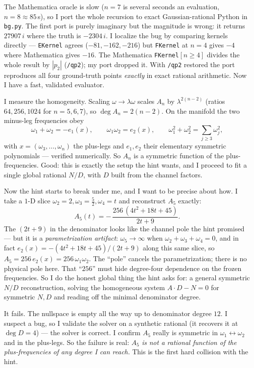 \documentclass{article}
\begin{document}
The Mathematica oracle is slow ($n=7$ is several seconds an evaluation,
$n=8\approx85$\,s), so I port the whole recursion to exact Gaussian-rational
Python in \texttt{bg.py}. The first port is purely imaginary but the magnitude is
wrong: it returns $27907\,i$ where the truth is $-2304\,i$. I localize the bug by
comparing kernels directly --- \texttt{EKernel} agrees ($-81,-162,-216$) but
\texttt{FKernel} at $n{=}4$ gives $-4$ where Mathematica gives $-16$. The
Mathematica \texttt{FKernel}$[n\ge4]$ divides the whole result by $|p_2|$
(\texttt{/qp2}); my port dropped it. With \texttt{/qp2} restored the port
reproduces all four ground-truth points \emph{exactly} in exact rational
arithmetic. Now I have a fast, validated evaluator.

I measure the homogeneity. Scaling $\omega\to\lambda\omega$ scales $A_n$ by
$\lambda^{2(n-2)}$ (ratios $64,256,1024$ for $n=5,6,7$), so $\deg A_n=2(n-2)$. On
the manifold the two minus-leg frequencies obey
\[
\omega_1+\omega_2=-e_1(x),\qquad \omega_1\omega_2=e_2(x),\qquad
\omega_1^2+\omega_2^2=\sum_{j\ge3}\omega_j^2,
\]
with $x=(\omega_3,\dots,\omega_n)$ the plus-legs and $e_1,e_2$ their elementary
symmetric polynomials --- verified numerically. So $A_n$ is a symmetric function
of the plus-frequencies. Good: this is exactly the setup the hint wants, and I
proceed to fit a single global rational $N/D$, with $D$ built from the channel
factors.

Now the hint starts to break under me, and I want to be precise about how. I take
a $1$-D slice $\omega_2{=}2,\omega_3{=}\tfrac52,\omega_4{=}t$ and reconstruct
$A_5$ exactly:
\[
A_5(t) = -\,\frac{256\,(4t^2+18t+45)}{2t+9}.
\]
The $(2t+9)$ in the denominator looks like the channel pole the hint promised ---
but it is a \emph{parametrization artifact}: $\omega_5\to\infty$ when
$\omega_2+\omega_3+\omega_4=0$, and in fact $e_2(x)=-(4t^2+18t+45)/(2t+9)$ along
this same slice, so $A_5=256\,e_2(x)=256\,\omega_1\omega_2$. The ``pole'' cancels
the parametrization; there is no physical pole here. That ``$256$'' must hide
degree-four dependence on the frozen frequencies. So I do the honest global thing
the hint asks for: a general symmetric $N/D$ reconstruction, solving the
homogeneous system $A\cdot D-N=0$ for symmetric $N,D$ and reading off the minimal
denominator degree.

It fails. The nullspace is empty all the way up to denominator degree $12$. I
suspect a bug, so I validate the solver on a synthetic rational (it recovers it at
$\deg D=4$) --- the solver is correct. I confirm $A_5$ really is symmetric in
$\omega_1\leftrightarrow\omega_2$ and in the plus-legs. So the failure is real:
\emph{$A_5$ is not a rational function of the plus-frequencies of any degree I can
reach.} This is the first hard collision with the hint.
\end{document}
